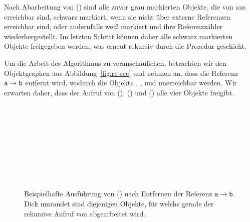 Nach Abarbeitung von () sind alle zuvor grau markierten Objekte, die von  aus erreichbar sind, schwarz markiert, wenn sie nicht über externe Referenzen erreichbar sind, oder andernfalls weiß markiert und ihre Referenzzähler wiederhergestellt.
Im letzten Schritt können daher alle schwarz markierten Objekte freigegeben werden, was erneut rekursiv durch die Prozedur  geschieht.

Um die Arbeit des Algorithmus zu veranschaulichen, betrachten wir den Objektgraphen aus Abbildung~\ref{fig:rc-scc} und nehmen an, dass die Referenz $\texttt{a} \rightarrow \texttt{b}$ entfernt wird, wodurch die Objekte , ,  und  unerreichbar werden.
Wir erwarten daher, dass der Aufruf von (), () und () alle vier Objekte freigibt.

\begin{figure}[h]
	\centering
	\begin{subfigure}{0.4\textwidth}
		\centering
		
	\end{subfigure}~\hspace{0.5cm}~
	\begin{subfigure}{0.473\textwidth}
		\centering
		
	\end{subfigure}\\[1cm]
	\begin{subfigure}{0.4\textwidth}
		\centering
		
	\end{subfigure}~\hspace{0.5cm}~
	\begin{subfigure}{0.4\textwidth}
		\centering
		
	\end{subfigure}\\[1cm]
	\begin{subfigure}{0.4\textwidth}
		\centering
		
	\end{subfigure}~\hspace{0.5cm}~
	\begin{subfigure}{0.4\textwidth}
		\centering
		
	\end{subfigure}
	\caption[Ausführung von ()]{Beispielhafte Ausführung von () nach Entfernen der Referenz $\texttt{a} \rightarrow \texttt{b}$. Dick umrandet sind diejenigen Objekte, für welchs gerade der rekursive Aufruf von  abgearbeitet wird.}
	\label{fig:rc-markgray-example}
\end{figure}

